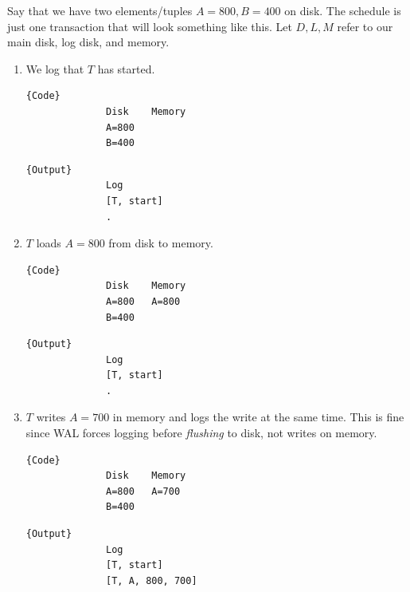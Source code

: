     \begin{example}
      \label{ex:bank-transfer}
      Say that we have two elements/tuples $A = 800, B = 400$ on disk. The schedule is just one transaction that will look something like this. Let $D, L, M$ refer to our main disk, log disk, and memory. 
      \begin{enumerate}
        \item We log that $T$ has started. 

          \noindent\begin{minipage}{.46\textwidth}
            \begin{lstlisting}[]{Code}
              Disk    Memory
              A=800   
              B=400
            \end{lstlisting}
            \end{minipage}
            \hfill
            \begin{minipage}{.45\textwidth}
            \begin{lstlisting}[]{Output}
              Log 
              [T, start]
              .
            \end{lstlisting}
          \end{minipage}

        \item $T$ loads $A=800$ from disk to memory. 

          \noindent\begin{minipage}{.46\textwidth}
            \begin{lstlisting}[]{Code}
              Disk    Memory
              A=800   A=800
              B=400
            \end{lstlisting}
            \end{minipage}
            \hfill
            \begin{minipage}{.45\textwidth}
            \begin{lstlisting}[]{Output}
              Log 
              [T, start]
              .
            \end{lstlisting}
          \end{minipage}

        \item $T$ writes $A=700$ in memory and logs the write at the same time. This is fine since WAL forces logging before \textit{flushing} to disk, not writes on memory. 

          \noindent\begin{minipage}{.46\textwidth}
            \begin{lstlisting}[]{Code}
              Disk    Memory
              A=800   A=700
              B=400
            \end{lstlisting}
            \end{minipage}
            \hfill
            \begin{minipage}{.45\textwidth}
            \begin{lstlisting}[]{Output}
              Log 
              [T, start]
              [T, A, 800, 700]
            \end{lstlisting}
          \end{minipage}


\end{enumerate}
\end{example}
